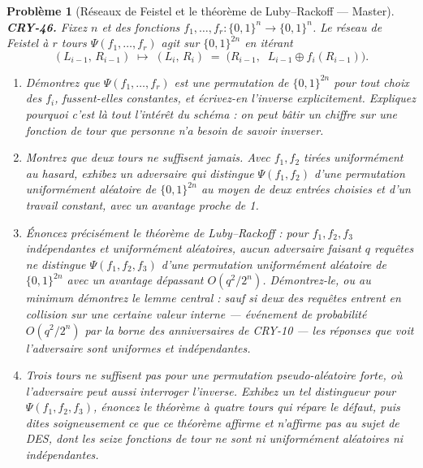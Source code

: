 \documentclass[11pt]{article}
\newtheorem{problem}{Problème}
\begin{document}
\begin{problem}[{Réseaux de Feistel et le théorème de Luby--Rackoff --- Master}]
\textbf{CRY-46.} Fixez $n$ et des fonctions $f_1, \dots, f_r \colon \{0,1\}^n \to
\{0,1\}^n$. Le réseau de Feistel à $r$ tours $\Psi(f_1, \dots, f_r)$ agit sur
$\{0,1\}^{2n}$ en itérant
\[ (L_{i-1},\, R_{i-1}) \;\longmapsto\; (L_i,\, R_i) \;=\; \bigl(R_{i-1},\;\; L_{i-1}
\oplus f_i(R_{i-1})\bigr). \]
\begin{enumerate}
\item[(a)] Démontrez que $\Psi(f_1, \dots, f_r)$ est une permutation de $\{0,1\}^{2n}$ pour
\textit{tout} choix des $f_i$, fussent-elles constantes, et écrivez-en l'inverse
explicitement. Expliquez pourquoi c'est là tout l'intérêt du schéma : on peut bâtir un
chiffre sur une fonction de tour que personne n'a besoin de savoir inverser.
\item[(b)] Montrez que deux tours ne suffisent jamais. Avec $f_1, f_2$ tirées uniformément au
hasard, exhibez un adversaire qui distingue $\Psi(f_1, f_2)$ d'une permutation uniformément
aléatoire de $\{0,1\}^{2n}$ au moyen de deux entrées choisies et d'un travail constant, avec
un avantage proche de 1.
\item[(c)] Énoncez précisément le théorème de Luby--Rackoff : pour $f_1, f_2, f_3$ indépendantes et
uniformément aléatoires, aucun adversaire faisant $q$ requêtes ne distingue
$\Psi(f_1,f_2,f_3)$ d'une permutation uniformément aléatoire de $\{0,1\}^{2n}$ avec un
avantage dépassant $O(q^2/2^n)$. Démontrez-le, ou au minimum démontrez le lemme central :
sauf si deux des requêtes entrent en collision sur une certaine valeur interne --- événement de
probabilité $O(q^2/2^n)$ par la borne des anniversaires de CRY-10 --- les réponses que voit
l'adversaire sont uniformes et indépendantes.
\item[(d)] Trois tours ne suffisent pas pour une permutation pseudo-aléatoire \textit{forte}, où
l'adversaire peut aussi interroger l'inverse. Exhibez un tel distingueur pour
$\Psi(f_1,f_2,f_3)$, énoncez le théorème à quatre tours qui répare le défaut, puis dites
soigneusement ce que ce théorème affirme et n'affirme pas au sujet de DES, dont les seize
fonctions de tour ne sont ni uniformément aléatoires ni indépendantes.
\end{enumerate}

\end{problem}
\end{document}
